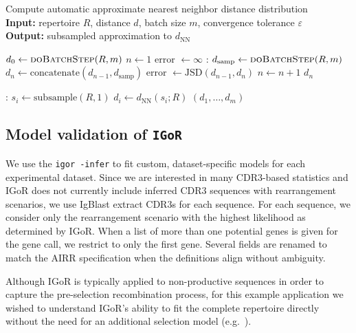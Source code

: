 \documentclass{article}
\begin{document}
\begin{algorithm}
    \caption{Compute automatic approximate nearest neighbor distance distribution\\
        \textbf{Input:} repertoire $R$, distance $d$, batch size $m$, convergence tolerance $\varepsilon$\\
        \textbf{Output:} subsampled approximation to $d_\text{NN}$}
    \label{alg:NNDistributionAveraging}
    \begin{algorithmic}
        \State $d_0 \gets \Call{doBatchStep}{R, m}$
        \State $n \gets 1$
        \State error $\gets \infty$
        :
        	\State $d_\text{samp} \gets \Call{doBatchStep}{R, m}$
        	\State $d_n \gets \text{concatenate}(d_{n-1}, d_\text{samp})$
        	\State error $\gets \text{JSD}(d_{n-1}, d_n)$
        	\State $n \gets n + 1$
        \EndWhile
            \Return $d_n$
    \end{algorithmic}
    \begin{algorithmic}
    :
		\State $s_i \gets \text{subsample}(R, 1)$
        \State $d_i \gets d_\text{NN}(s_i; R)$
	\EndFor
	\Return $(d_1, \dotsc, d_m)$
	\EndFunction
    \end{algorithmic}
\end{algorithm}

\subsection*{Model validation of \texttt{IGoR}}
We use the \texttt{igor -infer} to fit custom, dataset-specific models for each experimental dataset.
Since we are interested in many CDR3-based statistics and IGoR does not currently include inferred CDR3 sequences with rearrangement scenarios, we use IgBlast extract CDR3s for each sequence.
For each sequence, we consider only the rearrangement scenario with the highest likelihood as determined by IGoR.
When a list of more than one potential genes is given for the gene call, we restrict to only the first gene.
Several fields are renamed to match the AIRR specification when the definitions align without ambiguity.

Although IGoR is typically applied to non-productive sequences in order to capture the pre-selection recombination process, for this example application we wished to understand IGoR's ability to fit the complete repertoire directly without the need for an additional selection model (e.g.\ \cite{Elhanati2014-mf}).
\end{document}
